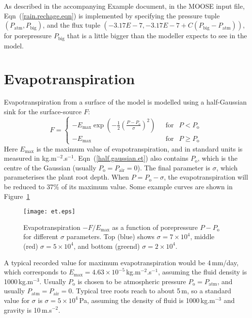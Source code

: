 \documentclass[]{scrreprt}
\begin{document}
As described in the accompanying Example document, in the MOOSE input
file, Eqn~(\ref{rain.rechage.eqn}) is implemented by specifying the
pressure tuple $(P_{\mathrm{atm}}, P_{\mathrm{big}})$, and the flux
tuple $(-3.17E-7, -3.17E-7 + C(P_{\mathrm{big}}-P_{\mathrm{atm}}))$,
for porepressure $P_{\mathrm{big}}$ that is a little bigger than the
modeller expects to see in the model.

\section{Evapotranspiration}
\label{et.section.}

Evapotranspiration from a surface of the model is modelled using a
half-Gaussian sink for the surface-source $F$:
\begin{equation}
F = \left\{
\begin{array}{ll}
-E_{\mathrm{max}} \exp\left(
-\frac{1}{2}\left(\frac{P-P_{\mathrm{o}}}{\sigma}\right)^{2} \right) &
\ \ \ \mbox{for } \ \ P<P_{\mathrm{o}} \\
-E_{\mathrm{max}} & \ \ \ \mbox{for } \ \ P\geq P_{\mathrm{o}}
\end{array}
\right.
\label{half.gaussian.et}
\end{equation}
Here $E_{\mathrm{max}}$ is the maximum value of evapotranspiration,
and in standard units is measured in kg.m$^{-2}$.s$^{-1}$.
Eqn~(\ref{half.gaussian.et}) also contains $P_{\mathrm{o}}$, which is the centre
of the Gaussian (usually $P_{\mathrm{o}}=P_{\mathrm{air}}=0$).  The final parameter is $\sigma$, which
parameterises the plant root depth.  When $P = P_{\mathrm{o}} - \sigma$, the
evapotranspiration will be reduced to 37\% of its maximum value.  Some
example curves are shown in Figure~\ref{et.fig}

\begin{figure}[htb]
\centering
\texttt{[image: et.eps]}
\caption{Evapotranspiration $-F/E_{\mathrm{max}}$ as a function of
  porepressure $P - P_{\mathrm{o}}$ for different $\sigma$ parameters.  Top (blue)
  shows $\sigma=7\times 10^{4}$, middle (red) $\sigma=5\times 10^{4}$,
  and bottom (greend) $\sigma=2\times 10^{4}$.}
\label{et.fig}
\end{figure}


A typical recorded value for maximum evapotranspiration would be
4\,mm/day, which corresponds to $E_{\mathrm{max}} = 4.63\times
10^{-5}$\,kg.m$^{-2}$.s$^{-1}$, assuming the fluid density is
1000\,kg.m$^{-3}$.  Usually $P_{\mathrm{o}}$ is chosen to be atmospheric
pressure $P_{\mathrm{o}} = P_{\mathrm{atm}}$, and usually $P_{\mathrm{atm}} =
P_{\mathrm{air}} = 0$.  Typical tree roots reach to
about 5\,m, so a standard value for $\sigma$ is $\sigma = 5\times
10^{4}$\,Pa, assuming the density of fluid
is 1000\,kg.m$^{-3}$ and gravity is 10\,m.s$^{-2}$.
\end{document}
